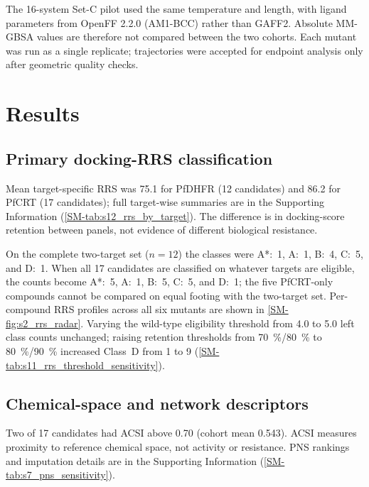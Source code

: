 \documentclass[journal=jcisd8,manuscript=article,layout=traditional]{achemso}
\begin{document}
The 16-system Set-C pilot used the same temperature and length, with ligand parameters from OpenFF 2.2.0 (AM1-BCC) rather than GAFF2. Absolute MM-GBSA values are therefore not compared between the two cohorts. Each mutant was run as a single replicate; trajectories were accepted for endpoint analysis only after geometric quality checks.


\section{Results}

\subsection{Primary docking-RRS classification}



Mean target-specific RRS was 75.1 for PfDHFR (12 candidates) and 86.2 for PfCRT (17 candidates); full target-wise summaries are in the Supporting Information (\cref{SM-tab:s12_rrs_by_target}). The difference is in docking-score retention between panels, not evidence of different biological resistance.

On the complete two-target set ($n=\num{12}$) the classes were A*:~\num{1}, A:~\num{1}, B:~\num{4}, C:~\num{5}, and D:~\num{1}. When all 17 candidates are classified on whatever targets are eligible, the counts become A*:~\num{5}, A:~\num{1}, B:~\num{5}, C:~\num{5}, and D:~\num{1}; the five PfCRT-only compounds cannot be compared on equal footing with the two-target set. Per-compound RRS profiles across all six mutants are shown in \cref{SM-fig:s2_rrs_radar}. Varying the wild-type eligibility threshold from \qty{4.0}{\kcalmol} to \qty{5.0}{\kcalmol} left class counts unchanged; raising retention thresholds from \qty{70}{\percent}/\qty{80}{\percent} to \qty{80}{\percent}/\qty{90}{\percent} increased Class~D from 1 to 9 (\cref{SM-tab:s11_rrs_threshold_sensitivity}).

\subsection{Chemical-space and network descriptors}

Two of 17 candidates had ACSI above \num{0.70} (cohort mean \num{0.543}). ACSI measures proximity to reference chemical space, not activity or resistance. PNS rankings and imputation details are in the Supporting Information (\cref{SM-tab:s7_pns_sensitivity}).
\end{document}
